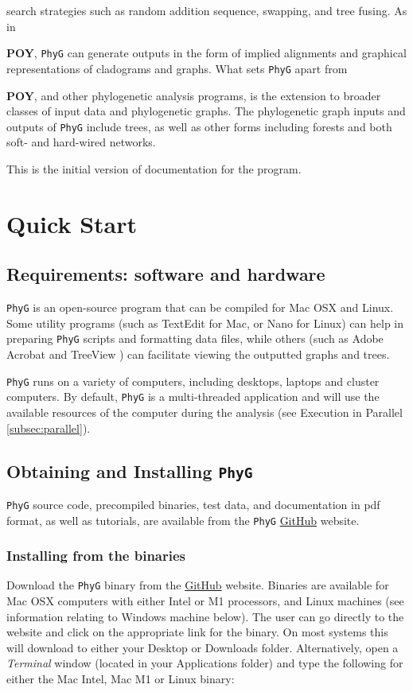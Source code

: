 \documentclass[11pt]{book}
\newcommand{\phyg}{\texttt{PhyG} }
\begin{document}
	search strategies such as random addition sequence, swapping, and tree fusing. As in {\textbf{POY}, 
	\phyg can generate outputs in the form of implied alignments and graphical representations of 
	cladograms and graphs. What sets \phyg apart from {\textbf{POY}, and other phylogenetic 
	analysis programs, is the extension to broader classes of input data and phylogenetic graphs. 
	The phylogenetic graph inputs and outputs of \texttt{PhyG} include trees, as well as other forms 
	including forests and both soft- and hard-wired networks.
		
	This is the initial version of documentation for the program.

	\section{Quick Start}
	
		\subsection{Requirements: software and hardware}
		\phyg is an open-source program that can be compiled for Mac OSX and Linux. Some 
		utility programs (such as TextEdit for Mac, or Nano for Linux) can help in preparing 
		\phyg scripts and formatting data files, while others (such as Adobe Acrobat and TreeView 
		\citep{page1996}) can facilitate viewing the outputted graphs and trees.
		
		\phyg runs on a variety of computers, including desktops, laptops and cluster computers.
		By default, \phyg is a multi-threaded application and will use the available resources of 
		the computer during the analysis (see Execution in Parallel \ref{subsec:parallel}). 
		
		\subsection{Obtaining and Installing \phyg}
		\phyg source code, precompiled binaries, test data, and documentation in pdf format, 
		as well as tutorials, are available from the \phyg \href{https://github.com/amnh/PhyGraph}{GitHub} website.

		\subsubsection{Installing from the binaries}
		Download the \phyg binary from the \href{https://github.com/amnh/PhyGraph}{GitHub} 
		website. Binaries are available for Mac OSX computers with either Intel or M1 processors, 
		and Linux machines (see information relating to Windows machine below).
		The user can go directly to the website and click on the appropriate link 
		for the binary. On most systems this will download to either your Desktop or Downloads folder. 
		Alternatively, open a \textit{Terminal} window (located in your Applications folder) and type 
		the following for either the Mac Intel, Mac M1 or Linux binary:
		
}}
\end{document}
